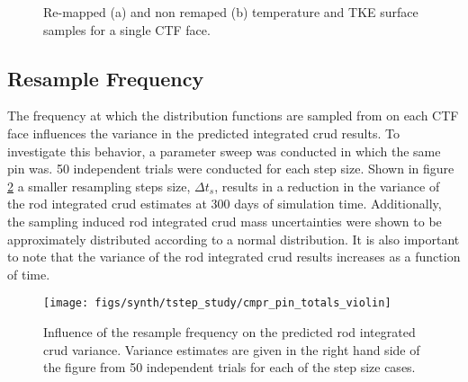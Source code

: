 \begin{figure}[H]%
    \centering
    \qquad
    \caption[Re-mapped and non remaped temperature and TKE surface samples]{Re-mapped (a) and non remaped (b) temperature and TKE surface samples for a single CTF face.}%
    \label{fig:remmap_comp}%
\end{figure}

\subsection{Resample Frequency}
\label{sec:resample_freq_study}

The frequency at which the distribution functions are sampled from on each CTF face influences the variance in the predicted integrated crud results.  To investigate this behavior, a parameter sweep was conducted in which the same pin was.  50 independent trials were conducted for each step size.  Shown in figure \ref{fig:cmprpintotalsviolin} a smaller resampling steps size, $\Delta t_s$, results in a reduction in the variance of the rod integrated crud estimates at 300 days of simulation time.   Additionally, the sampling induced rod integrated crud mass uncertainties were shown to be approximately distributed according to a normal distribution.  It is also important to note that the variance of the rod integrated crud results increases as a function of time.

\begin{figure}[H]
    \centering
    \texttt{[image: figs/synth/tstep\_study/cmpr\_pin\_totals\_violin]}
    \caption[Influence of the resample frequency on the predicted integrated crud variance.]{Influence of the resample frequency on the predicted rod integrated crud variance.  Variance estimates are given in the right hand side of the figure from 50 independent trials for each of the step size cases.}
    \label{fig:cmprpintotalsviolin}
\end{figure}


